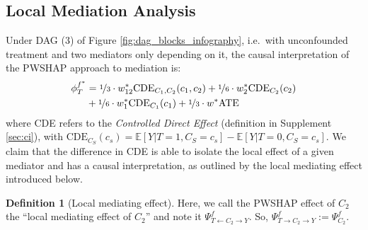 \documentclass{article}
\theoremstyle{plain}
\theoremstyle{definition}
\newtheorem{definition}[theorem]{Definition}
\theoremstyle{remark}
\newcommand{\effect}{\Psi}
\theoremstyle{mystyle}
\begin{document}
\subsection{Local Mediation Analysis}
\label{sec:local_med}
Under DAG (3) of Figure \ref{fig:dag_blocks_infography}, i.e.\ with unconfounded treatment and two mediators only depending on it, the causal interpretation of the PWSHAP approach to mediation is:
\begin{align*}
\phi_T^{f^*} &= \nicefrac{1}{3} \cdot w^*_{12} \text{CDE}_{C_1,C_2}(c_1,c_2) + \nicefrac{1}{6} \cdot w^*_2 \text{CDE}_{C_2}(c_2)\\
&+ \nicefrac{1}{6} \cdot w^*_1 \text{CDE}_{C_1}(c_1) + \nicefrac{1}{3} \cdot w^* \text{ATE}
\end{align*}
where CDE refers to the \textit{Controlled Direct Effect} (definition in Supplement \ref{sec:ci}), with $\text{CDE}_{C_S}(c_s) = \mathbb{E}[Y|T=1,C_S=c_s] - \mathbb{E}[Y|T=0,C_S=c_s]$. 
We claim that the difference in CDE is able to isolate the local effect of a given mediator and has a causal interpretation, as outlined by the local mediating effect introduced below. 


\begin{definition}[Local mediating effect] \label{def:local_mediating_effect}
Here, we call the PWSHAP effect of $C_2$ the ``local mediating effect of $C_2$'' and note it $\effect^f_{T \leftarrow C_2 \rightarrow Y}$. So, $\effect^f_{T \rightarrow C_2 \rightarrow Y}  := \effect^f_{C_2}$.
\end{definition}
\end{document}
